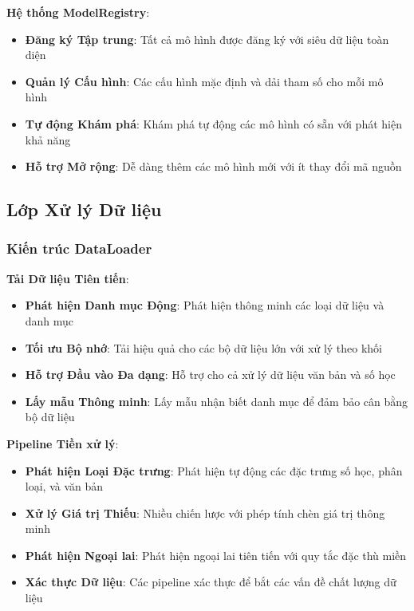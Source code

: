 \textbf{Hệ thống ModelRegistry}:
\begin{itemize}
    \item \textbf{Đăng ký Tập trung}: Tất cả mô hình được đăng ký với siêu dữ liệu toàn diện
    \item \textbf{Quản lý Cấu hình}: Các cấu hình mặc định và dải tham số cho mỗi mô hình
    \item \textbf{Tự động Khám phá}: Khám phá tự động các mô hình có sẵn với phát hiện khả năng
    \item \textbf{Hỗ trợ Mở rộng}: Dễ dàng thêm các mô hình mới với ít thay đổi mã nguồn
\end{itemize}

\subsection{Lớp Xử lý Dữ liệu}\label{subsec:data-processing}

\subsubsection{Kiến trúc DataLoader}\label{subsec:dataloader-architecture}

\textbf{Tải Dữ liệu Tiên tiến}:
\begin{itemize}
    \item \textbf{Phát hiện Danh mục Động}: Phát hiện thông minh các loại dữ liệu và danh mục
    \item \textbf{Tối ưu Bộ nhớ}: Tải hiệu quả cho các bộ dữ liệu lớn với xử lý theo khối  
    \item \textbf{Hỗ trợ Đầu vào Đa dạng}: Hỗ trợ cho cả xử lý dữ liệu văn bản và số học
    \item \textbf{Lấy mẫu Thông minh}: Lấy mẫu nhận biết danh mục để đảm bảo cân bằng bộ dữ liệu
\end{itemize}

\textbf{Pipeline Tiền xử lý}:
        \begin{itemize}
    \item \textbf{Phát hiện Loại Đặc trưng}: Phát hiện tự động các đặc trưng số học, phân loại, và văn bản
    \item \textbf{Xử lý Giá trị Thiếu}: Nhiều chiến lược với phép tính chèn giá trị thông minh
    \item \textbf{Phát hiện Ngoại lai}: Phát hiện ngoại lai tiên tiến với quy tắc đặc thù miền
    \item \textbf{Xác thực Dữ liệu}: Các pipeline xác thực để bắt các vấn đề chất lượng dữ liệu
\end{itemize}

